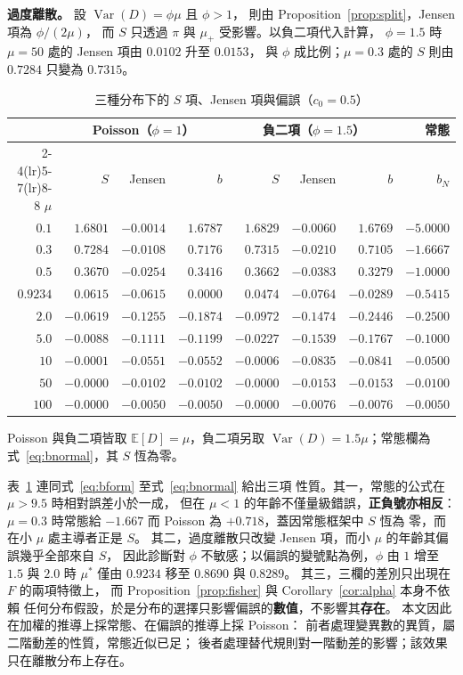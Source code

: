 \documentclass[UTF8, fontset=macnew, a4paper, 12pt]{ctexart}
\newcommand{\Ex}{\mathbb{E}}
\begin{document}
\textbf{過度離散。} 設 $\operatorname{Var}(D)=\phi\mu$ 且 $\phi>1$，
則由 Proposition~\ref{prop:split}，Jensen 項為 $\phi/(2\mu)$，
而 $S$ 只透過 $\pi$ 與 $\mu_{+}$ 受影響。以負二項代入計算，
$\phi=1.5$ 時 $\mu=50$ 處的 Jensen 項由 $0.0102$ 升至 $0.0153$，
與 $\phi$ 成比例；$\mu=0.3$ 處的 $S$ 則由 $0.7284$ 只變為 $0.7315$。

\begin{table}[H]
\centering
\caption{三種分布下的 $S$ 項、Jensen 項與偏誤（$c_0=0.5$）}
\footnotesize
\begin{tabular}{rrrrrrrr}
\toprule
 & \multicolumn{3}{c}{Poisson（$\phi=1$）} & \multicolumn{3}{c}{負二項（$\phi=1.5$）} & 常態\\
\cmidrule(lr){2-4}\cmidrule(lr){5-7}\cmidrule(lr){8-8}
$\mu$ & $S$ & Jensen & $b$ & $S$ & Jensen & $b$ & $b_N$\\
\midrule
$0.1$   & $1.6801$  & $-0.0014$ & $1.6787$  & $1.6829$  & $-0.0060$ & $1.6769$  & $-5.0000$\\
$0.3$   & $0.7284$  & $-0.0108$ & $0.7176$  & $0.7315$  & $-0.0210$ & $0.7105$  & $-1.6667$\\
$0.5$   & $0.3670$  & $-0.0254$ & $0.3416$  & $0.3662$  & $-0.0383$ & $0.3279$  & $-1.0000$\\
$0.9234$& $0.0615$  & $-0.0615$ & $0.0000$  & $0.0474$  & $-0.0764$ & $-0.0289$ & $-0.5415$\\
$2.0$   & $-0.0619$ & $-0.1255$ & $-0.1874$ & $-0.0972$ & $-0.1474$ & $-0.2446$ & $-0.2500$\\
$5.0$   & $-0.0088$ & $-0.1111$ & $-0.1199$ & $-0.0227$ & $-0.1539$ & $-0.1767$ & $-0.1000$\\
$10$    & $-0.0001$ & $-0.0551$ & $-0.0552$ & $-0.0006$ & $-0.0835$ & $-0.0841$ & $-0.0500$\\
$50$    & $-0.0000$ & $-0.0102$ & $-0.0102$ & $-0.0000$ & $-0.0153$ & $-0.0153$ & $-0.0100$\\
$100$   & $-0.0000$ & $-0.0050$ & $-0.0050$ & $-0.0000$ & $-0.0076$ & $-0.0076$ & $-0.0050$\\
\bottomrule
\end{tabular}

{\footnotesize Poisson 與負二項皆取 $\Ex[D]=\mu$，負二項另取
$\operatorname{Var}(D)=1.5\mu$；常態欄為式~\eqref{eq:bnormal}，其 $S$ 恆為零。}
\label{tab:normal}
\end{table}

表~\ref{tab:normal} 連同式~\eqref{eq:bform} 至式~\eqref{eq:bnormal} 給出三項
性質。其一，常態的公式在 $\mu>9.5$ 時相對誤差小於一成，
但在 $\mu<1$ 的年齡不僅量級錯誤，\textbf{正負號亦相反}：
$\mu=0.3$ 時常態給 $-1.667$ 而 Poisson 為 $+0.718$，蓋因常態框架中 $S$ 恆為
零，而在小 $\mu$ 處主導者正是 $S$。
其二，過度離散只改變 Jensen 項，而小 $\mu$ 的年齡其偏誤幾乎全部來自 $S$，
因此診斷對 $\phi$ 不敏感；以偏誤的變號點為例，$\phi$ 由 $1$ 增至 $1.5$ 與
$2.0$ 時 $\mu^{\ast}$ 僅由 $0.9234$ 移至 $0.8690$ 與 $0.8289$。
其三，三欄的差別只出現在 $F$ 的兩項特徵上，
而 Proposition~\ref{prop:fisher} 與 Corollary~\ref{cor:alpha} 本身不依賴
任何分布假設，於是分布的選擇只影響偏誤的\textbf{數值}，不影響其\textbf{存在}。
本文因此在加權的推導上採常態、在偏誤的推導上採 Poisson：
前者處理變異數的異質，屬二階動差的性質，常態近似已足；
後者處理替代規則對一階動差的影響；該效果只在離散分布上存在。
\end{document}
